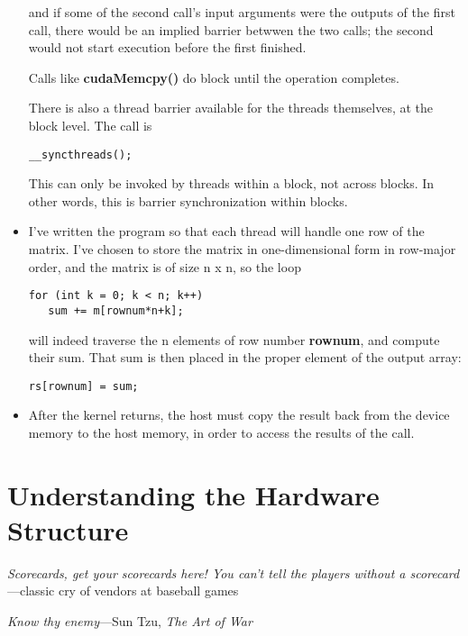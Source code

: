 \begin{itemize}
and if some of the second call's input arguments were the outputs of the
first call, there would be an implied barrier betwwen the two calls; the
second would not start execution before the first finished.

Calls like {\bf cudaMemcpy()} do block until the operation completes.

There is also a thread barrier available for the threads themselves, at
the block level.  The call is

\begin{Verbatim}[fontsize=\relsize{-2}]
__syncthreads();
\end{Verbatim}

This can only be invoked by threads within a block, not across blocks.
In other words, this is barrier synchronization within blocks.

\item I've written the program so that each thread will handle one row
of the matrix.  I've chosen to store the matrix in one-dimensional form
in row-major order, and the matrix is of size n x n, so the loop

\begin{Verbatim}[fontsize=\relsize{-2}]
for (int k = 0; k < n; k++)
   sum += m[rownum*n+k];
\end{Verbatim}

will indeed traverse the n elements of row number {\bf rownum}, and
compute their sum.  That sum is then placed in the proper element of the
output array:

\begin{Verbatim}[fontsize=\relsize{-2}]
rs[rownum] = sum;
\end{Verbatim}

\item After the kernel returns, the host must copy the result back from the
device memory to the host memory, in order to access the results of the
call.

\end{itemize}

\section{Understanding the Hardware Structure}

{\it Scorecards, get your scorecards here!  You can't tell the players
without a scorecard}---classic cry of vendors at baseball games

{\it Know thy enemy}---Sun Tzu, {\it The Art of War}

